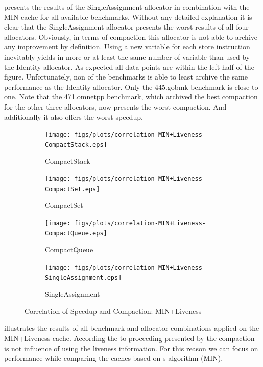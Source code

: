 \documentclass[onecolumn, openright, master, english, signatures]{dbrgrptt}
\begin{document}
 presents the results of the SingleAssignment allocator in combination with the \ac{MIN} cache for all available benchmarks. Without any detailed explanation it is clear that the SingleAssignment allocator presents the worst results of all four allocators. Obviously, in terms of compaction this allocator is not able to archive any improvement by definition. Using a new variable for each store instruction inevitably yields in more or at least the same number of variable than used by the Identity allocator. As expected all data points are within the left half of the figure. Unfortunately, non of the benchmarks is able to least archive the same performance as the Identity allocator. Only the 445.gobmk benchmark is close to one. Note that the 471.omnetpp benchmark, which archived the best compaction for the other three allocators, now presents the worst compaction. And additionally it also offers the worst speedup.

\begin{figure}[!ht]
  \begin{subfigure}[b]{0.5\textwidth}%
    \texttt{[image: figs/plots/correlation-MIN+Liveness-CompactStack.eps]}
    \caption{CompactStack}
    \label{fig:correlation-min-liveness-compactstack}
  \end{subfigure}%
  \begin{subfigure}[b]{0.5\textwidth}%
    \texttt{[image: figs/plots/correlation-MIN+Liveness-CompactSet.eps]}
    \caption{CompactSet}
    \label{fig:correlation-min-liveness-compactset}
  \end{subfigure}%
  \qquad
  \begin{subfigure}[b]{0.5\textwidth}%
    \texttt{[image: figs/plots/correlation-MIN+Liveness-CompactQueue.eps]}
    \caption{CompactQueue}
    \label{fig:correlation-min-liveness-compactqueue}
  \end{subfigure}%
  \begin{subfigure}[b]{0.5\textwidth}%
    \texttt{[image: figs/plots/correlation-MIN+Liveness-SingleAssignment.eps]}
    \caption{SingleAssignment}
    \label{fig:correlation-min-liveness-singleassignment}
  \end{subfigure}%
  \caption{Correlation of Speedup and Compaction: \ac{MIN}+Liveness}
  \label{fig:correlation-min-liveness}
\end{figure}

 illustrates the results of all benchmark and allocator combinations applied on the \ac{MIN}+Liveness cache. According the to proceeding presented by  the compaction is not influence of using the liveness information. For this reason we can focus on performance while comparing the caches based on \citeauthor{belady1966study}s algorithm (\ac{MIN}).
\end{document}
